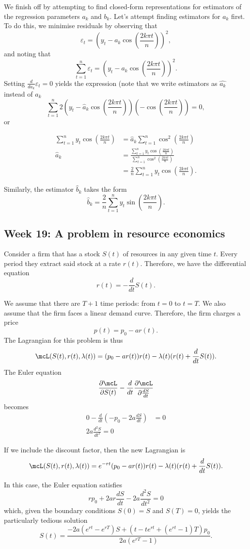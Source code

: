 \documentclass[a4paper, 12pt,oneside,openany]{book}
\begin{document}
We finish off by attempting to find closed-form representations for estimators of the regression parameters $a_k$ and $b_k$. Let's attempt finding estimators for $a_k$ first. To do this, we minimise residuals by observing that $$\varepsilon_t= \left(y_t - a_k \cos\left(\frac{2k\pi t}{n}\right)\right)^2,$$ and noting that $$\sum\limits_{t=1}^n \varepsilon_t = \left(y_t - a_k \cos\left(\frac{2k\pi t}{n}\right)\right)^2.$$ Setting $\frac{d}{da_k} \varepsilon_t=0$ yields the expression (note that we write estimators as $\hat{a_k}$ instead of $a_k$ $$ \sum\limits_{t=1}^n 2\left(y_t - \hat{a}_k \cos\left(\frac{2k\pi t}{n}\right)\right)\left(-\cos \left(\frac{2k\pi t}{n}\right)\right)=0,$$ or 

\begin{align*} \sum\limits_{t=1}^n y_t \cos\left(\frac{2k\pi t}{n}\right) &= \hat{a}_k \sum\limits_{t=1}^n \cos^2\left(\frac{2k\pi t}{n}\right)  \\ \hat{a}_k &= \frac{\sum\limits_{t=1}^n y_t \cos\left(\frac{2k\pi t}{n}\right)}{\sum\limits_{t=1}^n \cos^2\left(\frac{2k\pi t}{n}\right)} \\ &= \frac{2}{n} \sum\limits_{t=1}^n y_t \cos\left(\frac{2k\pi t}{n}\right).\end{align*}

Similarly, the estimator $\hat{b}_k$ takes the form $$\hat{b}_k = \frac{2}{n} \sum\limits_{t=1}^n y_t \sin\left(\frac{2k\pi t}{n}\right).$$

\subsection{Week 19: A problem in resource economics}

Consider a firm that has a stock $S(t)$ of resources in any given time $t$. Every period they extract said stock at a rate $r(t)$. Therefore, we have the differential equation $$r(t) = -\frac{d}{dt} S(t).$$

We assume that there are $T+1$ time periods: from $t=0$ to $t=T$. We also assume that the firm faces a linear demand curve.  Therefore, the firm charges a price $$p(t) = p_0-ar(t).$$ The Lagrangian for this problem is thus $$\mcL(S(t), r(t), \lambda(t)) = ( p_0-ar(t)) r(t) - \lambda(t) (r(t)+\frac{d}{dt} S(t)).$$ The Euler equation $$\frac{\partial \mcL}{\partial S(t)} - \frac{d}{dt} \frac{\partial \mcL}{\partial\frac{dS}{dt}}$$ becomes \begin{align*} 0-\frac{d}{dt}(-p_0-2a\frac{dS}{dt})&=0 \\ 2a \frac{d^2S}{dt^2} =0 \end{align*}

If we include the discount factor, then the new Lagrangian is $$\mcL(S(t), r(t), \lambda(t)) = e^{-rt}( p_0-ar(t)) r(t) - \lambda(t) (r(t)+\frac{d}{dt} S(t)).$$

In this case, the Euler equation satisfies $$rp_0 + 2ar \frac{dS}{dt}-2a \frac{d^2S}{dt^2}=0$$ which, given the boundary conditions $S(0)=S$ and $S(T)=0$, yields the particularly tedious solution $$S(t) = \frac{-2a(e^{rt}-e^{rT})S + (t-te^{rt}+(e^{rt}-1)T)p_0}{2a(e^{rT}-1)}.$$
\end{document}
